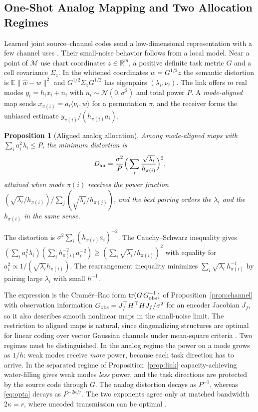 \documentclass[10pt,journal]{IEEEtran}
\newtheorem{proposition}{Proposition}
\newcommand{\E}{\mathbb E}
\newcommand{\M}{\mathcal M}
\DeclareMathOperator{\tr}{tr}
\begin{document}
\subsection{One-Shot Analog Mapping and Two Allocation Regimes}
Learned joint source--channel codes send a low-dimensional representation with a few channel uses \cite{bourtsoulatze2019deep}. Their small-noise behavior follows from a local model. Near a point of $\M$ use chart coordinates $z\in\mathbb R^m$, a positive definite task metric $G$ and a cell covariance $\Sigma_z$. In the whitened coordinates $w=G^{1/2}z$ the semantic distortion is $\E\|\hat w-w\|^2$ and $G^{1/2}\Sigma_zG^{1/2}$ has eigenpairs $(\lambda_i,\nu_i)$. The link offers $m$ real modes $y_i=h_ix_i+n_i$ with $n_i\sim\mathcal N(0,\sigma^2)$ and total power $P$. A \emph{mode-aligned} map sends $x_{\pi(i)}=a_i\langle\nu_i,w\rangle$ for a permutation $\pi$, and the receiver forms the unbiased estimate $y_{\pi(i)}/(h_{\pi(i)}a_i)$.
\begin{proposition}[Aligned analog allocation]\label{prop:analog}
Among mode-aligned maps with $\sum_ia_i^2\lambda_i\le P$, the minimum distortion is
\begin{equation}
 D_{\rm an}=\frac{\sigma^2}{P}\Big(\sum_i\frac{\sqrt{\lambda_i}}{h_{\pi(i)}}\Big)^2 ,
\end{equation}
attained when mode $\pi(i)$ receives the power fraction $(\sqrt{\lambda_i}/h_{\pi(i)})/\sum_j(\sqrt{\lambda_j}/h_{\pi(j)})$, and the best pairing orders the $\lambda_i$ and the $h_{\pi(i)}$ in the same sense.
\end{proposition}
\begin{IEEEproof}
The distortion is $\sigma^2\sum_i(h_{\pi(i)}a_i)^{-2}$. The Cauchy--Schwarz inequality gives $(\sum_ia_i^2\lambda_i)(\sum_ih_{\pi(i)}^{-2}a_i^{-2})\ge(\sum_i\sqrt{\lambda_i}/h_{\pi(i)})^2$ with equality for $a_i^2\propto1/(\sqrt{\lambda_i}h_{\pi(i)})$. The rearrangement inequality minimizes $\sum_i\sqrt{\lambda_i}\,h_{\pi(i)}^{-1}$ by pairing large $\lambda_i$ with small $h^{-1}$.
\end{IEEEproof}
The expression is the Cram\'er--Rao form $\tr(G\,G_{\rm obs}^{-1})$ of Proposition~\ref{prop:channel} with observation information $G_{\rm obs}=J_f^\top H^\top H J_f/\sigma^2$ for an encoder Jacobian $J_f$, so it also describes smooth nonlinear maps in the small-noise limit. The restriction to aligned maps is natural, since diagonalizing structures are optimal for linear coding over vector Gaussian channels under mean-square criteria \cite{lee1976optimal}. Two regimes must be distinguished. In the analog regime the power on a mode grows as $1/h$: weak modes receive \emph{more} power, because each task direction has to arrive. In the separated regime of Proposition~\ref{prop:link} capacity-achieving water-filling gives weak modes \emph{less} power, and the task directions are protected by the source code through $G$. The analog distortion decays as $P^{-1}$, whereas \eqref{eq:opta} decays as $P^{-2\kappa/r}$. The two exponents agree only at matched bandwidth $2\kappa=r$, where uncoded transmission can be optimal \cite{gastpar2003code}.
\end{document}
